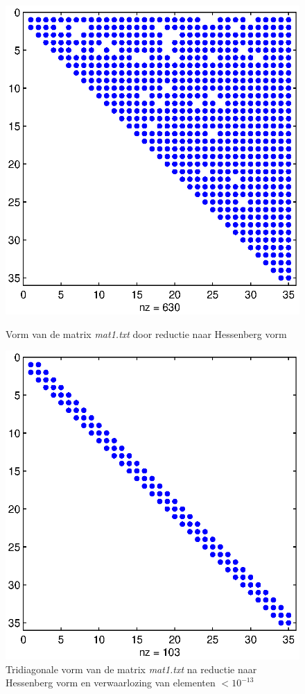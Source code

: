 \documentclass[a4paper]{article}
\begin{document}
\begin{figure}[H]
\begin{minipage}[t]{0.45\linewidth}
\centering
\centerline{\includegraphics[scale=0.45]{pictures/opgave4Hessenberg1.eps}}
\caption{Vorm van de matrix \textit{mat1.txt} door reductie naar Hessenberg vorm}
\label{fig:figure1}
\end{minipage}
\hfill
\begin{minipage}[t]{0.45\linewidth}
\centering
\centerline{\includegraphics[scale=0.45]{pictures/opgave4Hessenberg2.eps}}
\caption{Tridiagonale vorm van de matrix \textit{mat1.txt} na reductie naar Hessenberg vorm en verwaarlozing van elementen $<10^{-13}$}
\label{fig:figure2}
\end{minipage}
\end{figure}
\end{document}
